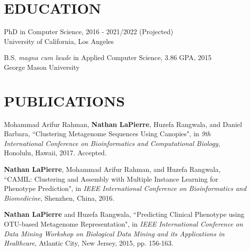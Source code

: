 \documentclass[margin, 10pt]{res} %
\begin{document}
\begin{resume}


\section{EDUCATION}

PhD in Computer Science, 2016 - 2021/2022 (Projected) \\
University of California, Los Angeles

B.S. {\sl magna cum laude} in Applied Computer Science, 3.86 GPA, 2015 \\
George Mason University
  

\section{PUBLICATIONS}
Mohammad Arifur Rahman, \textbf{Nathan LaPierre}, Huzefa Rangwala, and Daniel Barbara, ``Clustering Metagenome Sequences Using Canopies", in {\sl 9th International Conference on Bioinformatics and Computational Biology}, Honolulu, Hawaii, 2017. Accepted.

\textbf{Nathan LaPierre}, Mohammad Arifur Rahman, and Huzefa Rangwala, ``CAMIL: Clustering and Assembly with Multiple Instance Learning for Phenotype Prediction", in {\sl IEEE International Conference on Bioinformatics and Biomedicine}, Shenzhen, China, 2016.

\textbf{Nathan LaPierre} and Huzefa Rangwala, ``Predicting Clinical Phenotype using OTU-based Metagenome Representation", in {\sl IEEE International Conference on Data Mining Workshop on Biological Data Mining and its Applications in Healthcare}, Atlantic City, New Jersey, 2015, pp. 156-163.



\end{resume}
\end{document}
